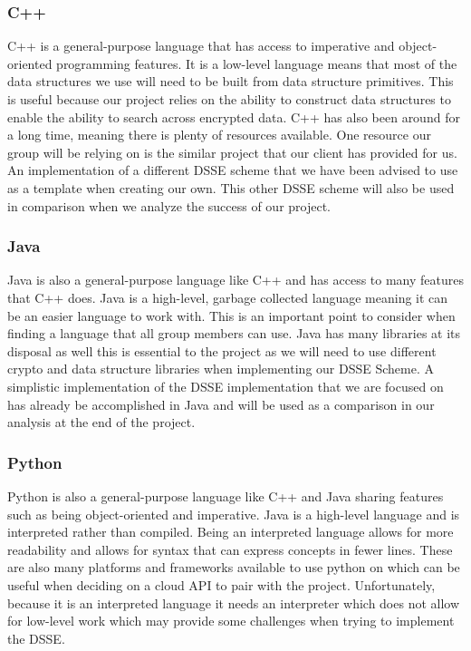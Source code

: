 \subsubsection{C++ } 
C++ is a general-purpose language that has access to imperative and object-oriented programming features. It is a low-level language means that most of the data structures we use will need to be built from data structure primitives. This is useful because our project relies on the ability to construct data structures to enable the ability to search across encrypted data. C++ has also been around for a long time, meaning there is plenty of resources available. One resource our group will be relying on is the similar project that our client has provided for us. An implementation of a different DSSE scheme that we have been advised to use as a template when creating our own. This other DSSE scheme will also be used in comparison when we analyze the success of our project. 

\subsubsection{Java}
Java is also a general-purpose language like C++ and has access to many features that C++ does. Java is a high-level, garbage collected language meaning it can be an easier language to work with.  This is an important point to consider when finding a language that all group members can use. Java has many libraries at its disposal as well this is essential to the project as we will need to use different crypto and data structure libraries when implementing our DSSE Scheme. A simplistic implementation of the DSSE implementation that we are focused on has already be accomplished in Java and will be used as a comparison in our analysis at the end of the project. 

\subsubsection{Python}
Python is also a general-purpose language like C++ and Java sharing features such as being object-oriented and imperative. Java is a high-level language and is interpreted rather than compiled. Being an interpreted language allows for more readability and allows for syntax that can express concepts in fewer lines. These are also many platforms and frameworks available to use python on which can be useful when deciding on a cloud API to pair with the project. Unfortunately, because it is an interpreted language it needs an interpreter which does not allow for low-level work which may provide some challenges when trying to implement the DSSE. 

